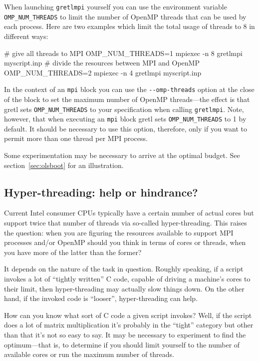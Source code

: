 \documentclass{article}
\begin{document}
When launching \texttt{gretlmpi} yourself you can use the
environment variable \verb|OMP_NUM_THREADS| to limit the number of
\textsf{OpenMP} threads that can be used by each process. Here are two
examples which limit the total usage of threads to 8 in different
ways:
\begin{code}
# give all threads to MPI
OMP_NUM_THREADS=1 mpiexec -n 8 gretlmpi myscript.inp
# divide the resources between MPI and OpenMP
OMP_NUM_THREADS=2 mpiexec -n 4 gretlmpi myscript.inp
\end{code}

In the context of an \texttt{mpi} block you can use the
\verb|--omp-threads| option at the close of the block to set the
maximum number of \textsf{OpenMP} threads---the effect is that gretl
sets \verb|OMP_NUM_THREADS| to your specification when calling
\texttt{gretlmpi}. Note, however, that when executing an
\texttt{mpi} block gretl sets \verb|OMP_NUM_THREADS| to 1 by
default. It should be necessary to use this option, therefore, only if
you want to permit more than one thread per MPI process.

Some experimentation may be necessary to arrive at the optimal budget.
See section~\ref{sec:olsboot} for an illustration.

\subsection{Hyper-threading: help or hindrance?}
\label{sec:hyper}

Current Intel consumer CPUs typically have a certain number of actual
cores but support twice that number of threads via so-called
hyper-threading. This raises the question: when you are figuring the
resources available to support MPI processes and/or \textsf{OpenMP}
should you think in terms of cores or threads, when you have more of
the latter than the former?

It depends on the nature of the task in question. Roughly speaking, if
a script invokes a lot of ``tightly written'' C code, capable of
driving a machine's cores to their limit, then hyper-threading may
actually slow things down. On the other hand, if the invoked code is
``looser'', hyper-threading can help.

How can you know what sort of C code a given script invokes? Well, if
the script does a lot of matrix multiplication it's probably in the
``tight'' category but other than that it's not so easy to say.  It
may be necessary to experiment to find the optimum---that is, to
determine if you should limit yourself to the number of available
cores or run the maximum number of threads.
\end{document}
